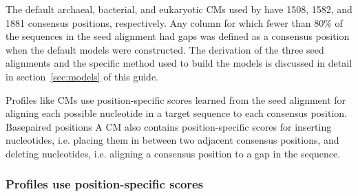 The default archaeal, bacterial, and eukaryotic CMs used by
 have 1508, 1582, and 1881 consensus positions,
respectively. Any column for which fewer than 80\% of the sequences in
the seed alignment had gaps was defined as a consensus position when
the default models were constructed. The derivation of the three seed
alignments and the specific method used to build the models is
discussed in detail in section~\ref{sec:models} of this guide.

Profiles like CMs use position-specific scores learned from the seed
alignment for aligning each possible nucleotide in a target sequence
to each consensus position. Basepaired positions 
A CM also contains position-specific scores for inserting nucleotides,
i.e. placing them in between two adjacent consensus positions, and deleting nucleotides,
i.e. aligning a consensus position to a gap in the sequence. 

\subsubsection{Profiles use position-specific scores}

